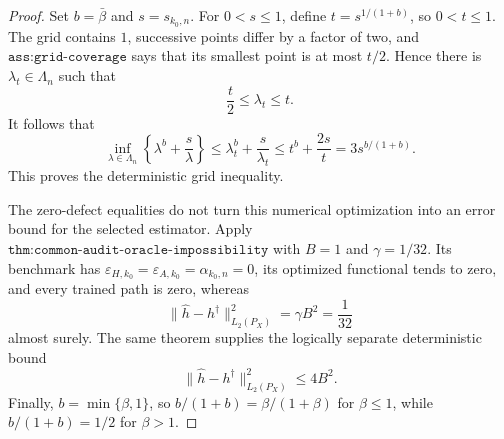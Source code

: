 \begin{proof}
Set \(b=\bar\beta\) and \(s=s_{k_0,n}\). For \(0<s\le1\), define \(t=s^{1/(1+b)}\), so \(0<t\le1\). The grid contains \(1\), successive points differ by a factor of two, and \(\texttt{ass:grid-coverage}\) says that its smallest point is at most \(t/2\). Hence there is \(\lambda_t\in\Lambda_n\) such that
\[
 \frac{t}{2}\le\lambda_t\le t.
\]
It follows that
\[
 \inf_{\lambda\in\Lambda_n}
 \left\{\lambda^b+\frac{s}{\lambda}\right\}
 \le \lambda_t^b+\frac{s}{\lambda_t}
 \le t^b+\frac{2s}{t}
 =3s^{b/(1+b)}.
\]
This proves the deterministic grid inequality.

The zero-defect equalities do not turn this numerical optimization into an error bound for the selected estimator. Apply \(\texttt{thm:common-audit-oracle-impossibility}\) with \(B=1\) and \(\gamma=1/32\). Its benchmark has \(\varepsilon_{H,k_0}=\varepsilon_{A,k_0}=\alpha_{k_0,n}=0\), its optimized functional tends to zero, and every trained path is zero, whereas
\[
 \|\widehat h-h^\dagger\|_{L_2(P_X)}^2
 =\gamma B^2=\frac1{32}
\]
almost surely. The same theorem supplies the logically separate deterministic bound
\[
 \|\widehat h-h^\dagger\|_{L_2(P_X)}^2\le4B^2.
\]
Finally, \(b=\min\{\beta,1\}\), so \(b/(1+b)=\beta/(1+\beta)\) for \(\beta\le1\), while \(b/(1+b)=1/2\) for \(\beta>1\).
\end{proof}